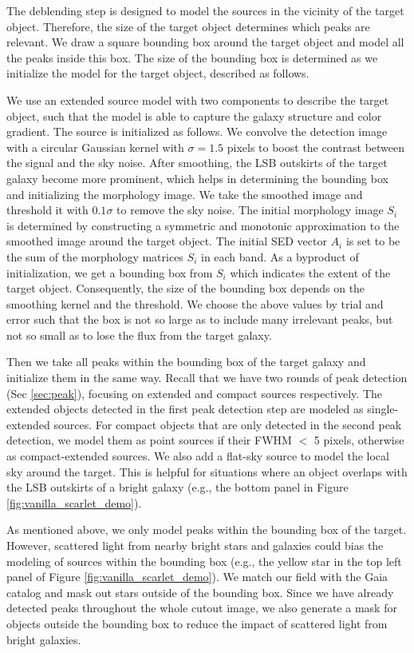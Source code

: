 \documentclass[twocolumn,astrosymb,twocolappendix]{aastex631}
\begin{document}
\begin{CJK*}{UTF8}{gbsn}
The deblending step is designed to model the sources in the vicinity of the target object. Therefore, the size of the target object determines which peaks are relevant. We draw a square bounding box around the target object and model all the peaks inside this box. The size of the bounding box is determined as we initialize the model for the target object, described as follows.

We use an extended source model with two components to describe the target object, such that the model is able to capture the galaxy structure and color gradient. The source is initialized as follows. We convolve the detection image with a circular Gaussian kernel with $\sigma=1.5$ pixels to boost the contrast between the signal and the sky noise. After smoothing, the LSB outskirts of the target galaxy become more prominent, which helps in determining the bounding box and initializing the morphology image. We take the smoothed image and threshold it with $0.1\sigma$ to remove the sky noise. The initial morphology image $S_i$ is determined by constructing a symmetric and monotonic approximation to the smoothed image around the target object. The initial SED vector $A_i$ is set to be the sum of the morphology matrices $S_i$ in each band. As a byproduct of initialization, we get a bounding box from $S_i$ which indicates the extent of the target object. Consequently, the size of the bounding box depends on the smoothing kernel and the threshold. We choose the above values by trial and error such that the box is not so large as to include many irrelevant peaks, but not so small as to lose the flux from the target galaxy. 

Then we take all peaks within the bounding box of the target galaxy and initialize them in the same way. Recall that we have two rounds of peak detection (Sec \ref{sec:peak}), focusing on extended and compact sources respectively. The extended objects detected in the first peak detection step are modeled as single-extended sources. For compact objects that are only detected in the second peak detection, we model them as point sources if their FWHM $<$ 5 pixels, otherwise as compact-extended sources. We also add a flat-sky source to model the local sky around the target. This is helpful for situations where an object overlaps with the LSB outskirts of a bright galaxy (e.g., the bottom panel in Figure \ref{fig:vanilla_scarlet_demo}).

As mentioned above, we only model peaks within the bounding box of the target. However, scattered light from nearby bright stars and galaxies could bias the modeling of sources within the bounding box (e.g., the yellow star in the top left panel of Figure \ref{fig:vanilla_scarlet_demo}). We match our field with the Gaia catalog \citep{GAIA2016,GAIA2018} and mask out stars outside of the bounding box. Since we have already detected peaks throughout the whole cutout image, we also generate a mask for objects outside the bounding box to reduce the impact of scattered light from bright galaxies. 


\end{CJK*}
\end{document}
